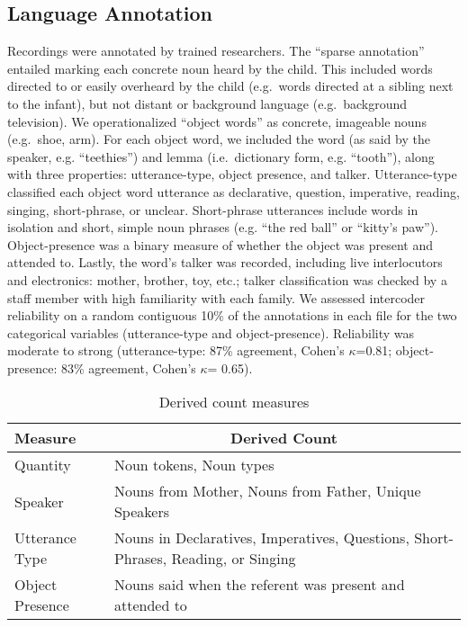 \documentclass[floatsintext,man]{apa6}
\theoremstyle{definition}
\theoremstyle{definition}
\theoremstyle{definition}
\theoremstyle{remark}
\begin{document}
\hypertarget{language-annotation}{%
\subsection{Language Annotation}\label{language-annotation}}

Recordings were annotated by trained researchers. The \enquote{sparse
annotation} entailed marking each concrete noun heard by the child. This
included words directed to or easily overheard by the child (e.g.~words
directed at a sibling next to the infant), but not distant or background
language (e.g.~background television). We operationalized
\enquote{object words} as concrete, imageable nouns (e.g.~shoe, arm).
For each object word, we included the word (as said by the speaker, e.g.
\enquote{teethies}) and lemma (i.e.~dictionary form, e.g.
\enquote{tooth}), along with three properties: utterance-type, object
presence, and talker. Utterance-type classified each object word
utterance as declarative, question, imperative, reading, singing,
short-phrase, or unclear. Short-phrase utterances include words in
isolation and short, simple noun phrases (e.g. \enquote{the red ball} or
\enquote{kitty's paw}). Object-presence was a binary measure of whether
the object was present and attended to. Lastly, the word's talker was
recorded, including live interlocutors and electronics: mother, brother,
toy, etc.; talker classification was checked by a staff member with high
familiarity with each family. We assessed intercoder reliability on a
random contiguous 10\% of the annotations in each file for the two
categorical variables (utterance-type and object-presence). Reliability
was moderate to strong (utterance-type: 87\% agreement, Cohen's
\(\kappa\)=0.81; object-presence: 83\% agreement, Cohen's \(\kappa\)=
0.65).

\begin{table}[tbp]
\begin{center}
\begin{threeparttable}
\caption{\label{tab:measures-tab}Derived count measures}
\small{
\begin{tabular}{ll}
\toprule
Measure & \multicolumn{1}{c}{Derived Count}\\
\midrule
Quantity & Noun tokens, Noun types\\
Speaker & Nouns from Mother, Nouns from Father, Unique Speakers\\
Utterance Type & Nouns in Declaratives, Imperatives, Questions, Short-Phrases, Reading, or Singing\\
Object Presence & Nouns said when the referent was present and attended to\\
\bottomrule
\end{tabular}
}
\end{threeparttable}
\end{center}
\end{table}
\end{document}
